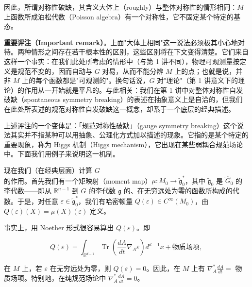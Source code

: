因此，所谓对称性破缺，其含义大体上（roughly）与整体对称性的情形相同：$M$ 上函数所成泊松代数（Poisson algebra）有一个对称性，它不固定某个特定的基态。

\textbf{重要评注（Important remark）}。上面"大体上相同"这一说法必须极其小心地对待。两种情形之间存在若干根本性的区别，这些区别将在下文变得清楚。它们来自这样一个事实：在我们此处所考虑的情形中（与第 1 讲不同），物理可观测量按定义是规范不变的，因而自动与 $G$ 对易，从而不能分辨 $M$ 上的点；也就是说，并非 $M$ 上的每个函数都是"可观测的"。换句话说，$G$ 对"理论"（第 1 讲意义下的理论）的作用从一开始就是平凡的。与此相关：我们在第 1 讲中对整体对称性自发破缺（spontaneous symmetry breaking）的表述在抽象意义上是自洽的，但我们在此处所表述的规范对称性自发破缺这一概念，却系于一个底层的经典描述。

上述评注的一个变体是：「规范对称性破缺」（gauge symmetry breaking）这个说法其实并不指某种可以用抽象、公理化方式加以描述的现象。它指的是某个特定的重要现象，称为 Higgs 机制（Higgs mechanism），它出现在某些弱耦合规范场论中。下面我们用例子来说明这一机制。

现在我们（在经典层面）计算 $G$ 的作用。首先我们有一个矩映射（moment map）$\mu:M_0\to\widetilde{\mathfrak g}_0^*$，其中 $\widetilde{\mathfrak g}_0$ 是 $\widehat{G}_0$ 的李代数——即从 $\mathbb{R}^{n-1}$ 到 $G$ 的李代数 $\mathfrak g$ 的、在无穷远处为零的函数所构成的代数。于是，对任意 $\varepsilon\in\widetilde{\mathfrak g}_0^*$，我们有哈密顿量 $Q(\varepsilon)\in C^\infty(M_0)$，由 $Q(\varepsilon)(X)=\mu(X)(\varepsilon)$ 定义。


事实上，用 Noether 形式很容易算出 $Q(\varepsilon)$。即

\begin{equation}
  \tag{2.1}
  \label{eq:2-1}
  Q(\varepsilon)=\int_{\mathbb{R}^{d-1}}\operatorname{Tr}\left(\frac{dA}{dt}\nabla_A\varepsilon\right)d^{d-1}x+\text{物质场项},
\end{equation}

在 $M$ 上，若 $\varepsilon$ 在无穷远处为零，则 $Q(\varepsilon)=0$。因此，在 $M$ 上有 $\nabla_A^*\frac{dA}{dt}=$ 物质场项。特别地，在纯规范场论中 $\nabla_A^*\frac{dA}{dt}=0$。

